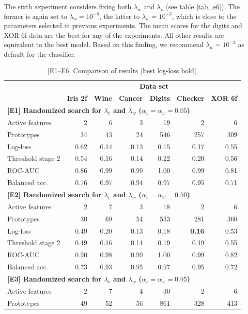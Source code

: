 %
The sixth experiment considers fixing both $\lambda_w$ and $\lambda_v$ (see table \ref{tab_e6}).
The former is again set to $\lambda_w=10^{-8}$, the latter to $\lambda_w=10^{-3}$, which is close to the parameters selected in previous experiments.
The mean scores for the digits and XOR 6f data are the best for any of the experiments.
All other results are equivalent to the best model.
Based on this finding, we recommend $\lambda_w=10^{-3}$ as default for the classifier.\par
%
\begin{table}
\caption{[E1--E6] Comparison of results (best log-loss bold)}
\label{tab_e1_to_e6}
%
\begin{center}
\small
\begin{tabular}{|lrrrrrr|}
\hline
&\multicolumn{6}{c|}{\textbf{\hrulefill\ Data set \hrulefill}}\\
&\textbf{Iris 2f}&\textbf{Wine}&\textbf{Cancer}&\textbf{Digits}&\textbf{Checker}&\textbf{XOR 6f}\\
\multicolumn{7}{|l|}{\textbf{[E1] Randomized search for $\lambda_v$ and $\lambda_w$ ($\alpha_v=\alpha_w=0.05$)}}\\
Active features&2&6&3&19&2&6\\
Prototypes&34&43&24&546&257&309\\
Log-loss&0.62&0.14&0.13&0.15&0.17&0.55\\
Threshold stage 2&0.54&0.16&0.14&0.22&0.20&0.56\\
ROC-AUC&0.86&0.99&0.99&1.00&0.99&0.81\\
Balanced acc.&0.76&0.97&0.94&0.97&0.95&0.71\\
\multicolumn{7}{|l|}{\textbf{[E2] Randomized search for $\lambda_v$ and $\lambda_w$ ($\alpha_v=\alpha_w=0.50$)}}\\
Active features&2&7&3&18&2&6\\
Prototypes&30&69&54&533&281&360\\
Log-loss&0.49&0.20&0.13&0.18&\textbf{0.16}&0.53\\
Threshold stage 2&0.49&0.16&0.14&0.19&0.19&0.55\\
ROC-AUC&0.90&0.98&0.99&1.00&0.99&0.82\\
Balanced acc.&0.73&0.93&0.95&0.97&0.95&0.72\\
\multicolumn{7}{|l|}{\textbf{[E3] Randomized search for $\lambda_v$ and $\lambda_w$ ($\alpha_v=\alpha_w=0.95$)}}\\
Active features&2&7&4&30&2&6\\
Prototypes&49&52&56&861&328&413\\

\end{tabular}
\end{center}
\end{table}
